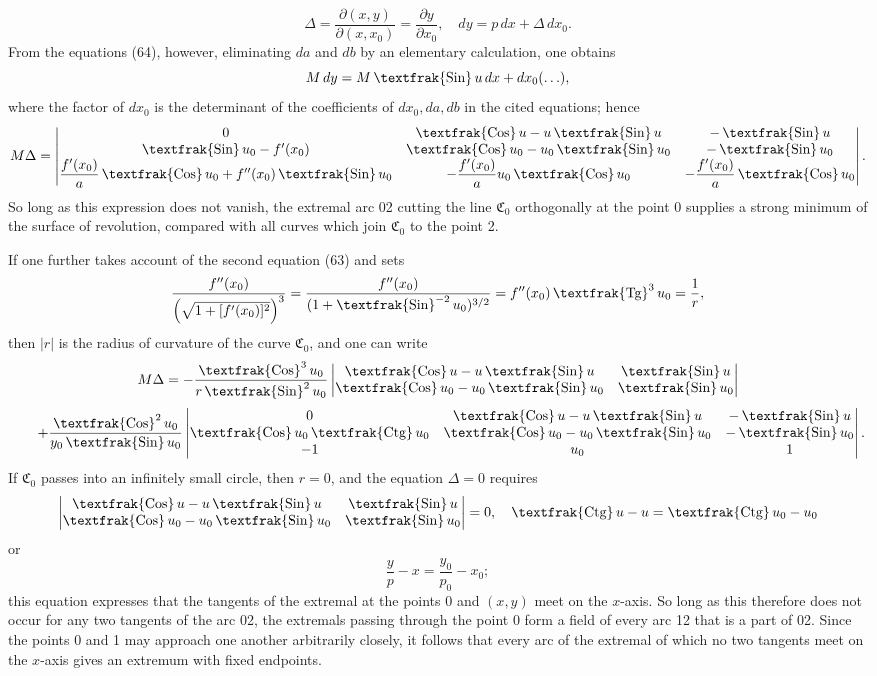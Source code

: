 \documentclass[11pt,a4paper,leqno]{article}
\newcommand{\Cof}{\mathop{\text{\textfrak{Cos}}}\nolimits}
\newcommand{\Sin}{\mathop{\text{\textfrak{Sin}}}\nolimits}
\newcommand{\Tg}{\mathop{\text{\textfrak{Tg}}}\nolimits}
\newcommand{\Ctg}{\mathop{\text{\textfrak{Ctg}}}\nolimits}
\begin{document}
\[
\Delta=\frac{\partial(x,y)}{\partial(x,x_0)}=\frac{\partial y}{\partial x_0},\quad
dy=p\,dx+\Delta\,dx_0.
\]
From the equations (64), however, eliminating $da$ and $db$ by an elementary calculation, one obtains
\[
M\,dy=M\Sin u\,dx+dx_0(\ldots),
\]
where the factor of $dx_0$ is the determinant of the coefficients of $dx_0,da,db$ in the cited equations; hence
\[
M\Delta=
\begin{vmatrix}
0 & \Cof u-u\Sin u & -\Sin u\\
\Sin u_0-f'(x_0) & \Cof u_0-u_0\Sin u_0 & -\Sin u_0\\
\dfrac{f'(x_0)}{a}\Cof u_0+f''(x_0)\Sin u_0 &
-\dfrac{f'(x_0)}{a}u_0\Cof u_0 &
-\dfrac{f'(x_0)}{a}\Cof u_0
\end{vmatrix}.
\]
So long as this expression does not vanish, the extremal arc 02 cutting the line $\mathfrak{C}_0$ orthogonally at the point 0 supplies a strong minimum of the surface of revolution, compared with all curves which join $\mathfrak{C}_0$ to the point 2.

If one further takes account of the second equation (63) and sets
\[
\frac{f''(x_0)}{\left(\sqrt{1+[f'(x_0)]^2}\right)^3}
=
\frac{f''(x_0)}{(1+\Sin^{-2}u_0)^{3/2}}
=
f''(x_0)\Tg^3u_0
=
\frac{1}{r},
\]
then $|r|$ is the radius of curvature of the curve $\mathfrak{C}_0$, and one can write
\[
M\Delta
=
-\frac{\Cof^3u_0}{r\Sin^2u_0}
\begin{vmatrix}
\Cof u-u\Sin u & \Sin u\\
\Cof u_0-u_0\Sin u_0 & \Sin u_0
\end{vmatrix}
\]
\[
\qquad
+\frac{\Cof^2u_0}{y_0\Sin u_0}
\begin{vmatrix}
0 & \Cof u-u\Sin u & -\Sin u\\
\Cof u_0\Ctg u_0 & \Cof u_0-u_0\Sin u_0 & -\Sin u_0\\
-1 & u_0 & 1
\end{vmatrix}.
\]
If $\mathfrak{C}_0$ passes into an infinitely small circle, then $r=0$, and the equation $\Delta=0$ requires
\[
\begin{vmatrix}
\Cof u-u\Sin u & \Sin u\\
\Cof u_0-u_0\Sin u_0 & \Sin u_0
\end{vmatrix}
=0,\quad
\Ctg u-u=\Ctg u_0-u_0
\]
or
\[
\frac{y}{p}-x=\frac{y_0}{p_0}-x_0;
\]
this equation expresses that the tangents of the extremal at the points 0 and $(x,y)$ meet on the $x$-axis. So long as this therefore does not occur for any two tangents of the arc 02, the extremals passing through the point 0 form a field of every arc 12 that is a part of 02. Since the points 0 and 1 may approach one another arbitrarily closely, it follows that every arc of the extremal of which no two tangents meet on the $x$-axis gives an extremum with fixed endpoints.
\end{document}
